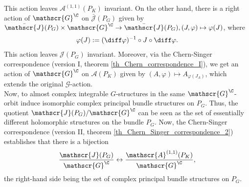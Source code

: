 This action leaves \(\mathscr{A}^{(1,1)}(P_K)\) invariant. On the other hand, there is a right action of \(\mathscr{G}^\C\) on \(\bar{\mathscr{J}}(P_G)\) given by \(\bar{\mathscr{J}}(P_G) \times \mathscr{G}^\C \to \bar{\mathscr{J}}(P_G), (J, \varphi) \mapsto \varphi(J)\), where 
\[
\varphi(J) := (\diff \varphi)^{-1} \circ J \circ \diff \varphi.
\]
This action leaves \(\mathscr{J}(P_G)\) invariant. Moreover, via the Chern-Singer correspondence (version I, theorem \ref{th_Chern_correspondence_I}), we get an action of \(\mathscr{G}^\C\) on \(\mathscr{A}(P_K)\) given by \((A, \varphi) \mapsto A_{\varphi(J_A)}\), which extends the original \(\mathscr{G}\)-action. \\

Now, to almost complex integrable \(G\)-structures in the same \(\mathscr{G}^\C\)-orbit induce isomorphic complex principal bundle structures on \(P_G\). Thus, the quotient \(\mathscr{J}(P_G)/\mathscr{G}^\C\) can be seen as the set of essentially different holomorphic structures on the bundle \(P_G\). Now, the Chern-Singer correspondence (version II, theorem \ref{th_Chern_Singer_correspondence_2}) establishes that there is a bijection
\begin{equation} \label{CS_corresp_quot}
\frac{\mathscr{J}(P_G)}{\mathscr{G}^\C} \leftrightarrow \frac{\mathscr{A}^{(1,1)}(P_K)}{\mathscr{G}^\C},
\end{equation}
the right-hand side being the set of complex principal bundle structures on \(P_G\).
